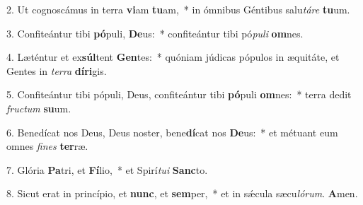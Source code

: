 2. Ut cognoscámus in terra \textbf{vi}am \textbf{tu}am,~*  in ómnibus Géntibus salu\textit{tá}\textit{re} \textbf{tu}um.\

3. Confiteántur tibi \textbf{pó}puli, \textbf{De}us:~*  confiteántur tibi pó\textit{pu}\textit{li} \textbf{om}nes.\

4. Læténtur et ex\textbf{súl}tent \textbf{Gen}tes:~*  quóniam júdicas pópulos in æquitáte, et Gentes in \textit{ter}\textit{ra} \textbf{dí}\textbf{ri}gis.\

5. Confiteántur tibi pópuli, Deus, confiteántur tibi \textbf{pó}puli \textbf{om}nes:~*  terra dedit \textit{fruc}\textit{tum} \textbf{su}um.\

6. Benedícat nos Deus, Deus noster, bene\textbf{dí}cat nos \textbf{De}us:~*  et métuant eum omnes \textit{fi}\textit{nes} \textbf{ter}ræ.\

7. Glória \textbf{Pa}tri, et \textbf{Fí}lio,~*  et Spirí\textit{tu}\textit{i} \textbf{Sanc}to.\

8. Sicut erat in princípio, et \textbf{nunc}, et \textbf{sem}per,~*  et in sǽcula sæcu\textit{ló}\textit{rum}. \textbf{A}men.\

